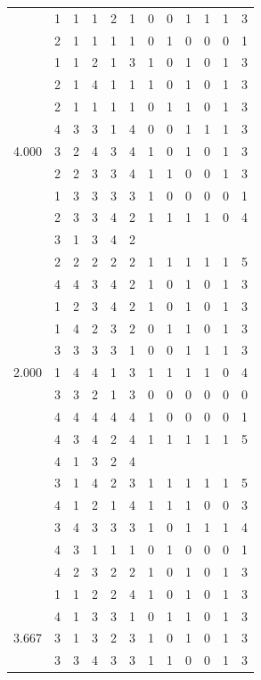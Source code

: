\documentclass[]{book}
\theoremstyle{definition}
\theoremstyle{definition}
\theoremstyle{definition}
\theoremstyle{remark}
\begin{document}
\begin{table}
{\begin{tabular}[t]{rrrrrrrrrrrr}
 & 1 & 1 & 1 & 2 & 1 & 0 & 0 & 1 & 1 & 1 & 3\\
 & 2 & 1 & 1 & 1 & 1 & 0 & 1 & 0 & 0 & 0 & 1\\
 & 1 & 1 & 2 & 1 & 3 & 1 & 0 & 1 & 0 & 1 & 3\\
 & 2 & 1 & 4 & 1 & 1 & 1 & 0 & 1 & 0 & 1 & 3\\
 & 2 & 1 & 1 & 1 & 1 & 0 & 1 & 1 & 0 & 1 & 3\\
 & 4 & 3 & 3 & 1 & 4 & 0 & 0 & 1 & 1 & 1 & 3\\
4.000 & 3 & 2 & 4 & 3 & 4 & 1 & 0 & 1 & 0 & 1 & 3\\
 & 2 & 2 & 3 & 3 & 4 & 1 & 1 & 0 & 0 & 1 & 3\\
 & 1 & 3 & 3 & 3 & 3 & 1 & 0 & 0 & 0 & 0 & 1\\
 & 2 & 3 & 3 & 4 & 2 & 1 & 1 & 1 & 1 & 0 & 4\\
 & 3 & 1 & 3 & 4 & 2 &  &  &  &  &  & \\
 & 2 & 2 & 2 & 2 & 2 & 1 & 1 & 1 & 1 & 1 & 5\\
 & 4 & 4 & 3 & 4 & 2 & 1 & 0 & 1 & 0 & 1 & 3\\
 & 1 & 2 & 3 & 4 & 2 & 1 & 0 & 1 & 0 & 1 & 3\\
 & 1 & 4 & 2 & 3 & 2 & 0 & 1 & 1 & 0 & 1 & 3\\
 & 3 & 3 & 3 & 3 & 1 & 0 & 0 & 1 & 1 & 1 & 3\\
2.000 & 1 & 4 & 4 & 1 & 3 & 1 & 1 & 1 & 1 & 0 & 4\\
 & 3 & 3 & 2 & 1 & 3 & 0 & 0 & 0 & 0 & 0 & 0\\
 & 4 & 4 & 4 & 4 & 4 & 1 & 0 & 0 & 0 & 0 & 1\\
 & 4 & 3 & 4 & 2 & 4 & 1 & 1 & 1 & 1 & 1 & 5\\
 & 4 & 1 & 3 & 2 & 4 &  &  &  &  &  & \\
 & 3 & 1 & 4 & 2 & 3 & 1 & 1 & 1 & 1 & 1 & 5\\
 & 4 & 1 & 2 & 1 & 4 & 1 & 1 & 1 & 0 & 0 & 3\\
 & 3 & 4 & 3 & 3 & 3 & 1 & 0 & 1 & 1 & 1 & 4\\
 & 4 & 3 & 1 & 1 & 1 & 0 & 1 & 0 & 0 & 0 & 1\\
 & 4 & 2 & 3 & 2 & 2 & 1 & 0 & 1 & 0 & 1 & 3\\
 & 1 & 1 & 2 & 2 & 4 & 1 & 0 & 1 & 0 & 1 & 3\\
 & 4 & 1 & 3 & 3 & 1 & 0 & 1 & 1 & 0 & 1 & 3\\
3.667 & 3 & 1 & 3 & 2 & 3 & 1 & 0 & 1 & 0 & 1 & 3\\
 & 3 & 3 & 4 & 3 & 3 & 1 & 1 & 0 & 0 & 1 & 3\\

\end{tabular}}
\end{table}
\end{document}
